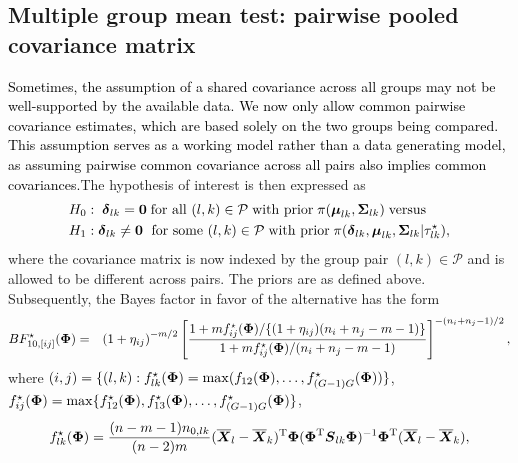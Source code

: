 \documentclass[pdflatex,sn-basic]{sn-jnl}%
\newcommand{\uzero}            {\mbox{\boldmath$0$}}
\def\be{\begin{eqnarray}}
\def\ee{\end{eqnarray}}
\def\trans{^{\rm T}}
\newcommand{\uS}       {\mbox{\boldmath$S$}}
\newcommand{\uX}       {\mbox{\boldmath$X$}}
\newcommand{\udelta}            {\mbox{\boldmath$\delta$}}
\newcommand{\umu}               {\mbox{\boldmath$\mu$}}
\newcommand{\uSigma}            {\mbox{\boldmath$\Sigma$}}
\newcommand{\uPhi}              {\mbox{\boldmath$\Phi$}}
\theoremstyle{thmstyleone}%
\theoremstyle{thmstyletwo}%
\theoremstyle{thmstylethree}%
\begin{document}
\subsection{Multiple group mean test: pairwise pooled covariance matrix} \label{sec:testid}
\textcolor{black}{Sometimes, the assumption of a shared covariance across all groups may not be well-supported by the available data. We now only allow common pairwise covariance estimates, which are based solely on the two groups being compared. This assumption serves as a working model rather than a data generating model, as assuming pairwise common covariance across all pairs also implies common covariances.}The hypothesis of interest is then expressed as
\be
\begin{split}
H_{0}&:\;\udelta_{lk} = \uzero \; \mbox{for all }(l, k)\in\mathcal{P}
\;\mbox{with prior}\; \pi(\umu_{lk},\uSigma_{lk})\; \mbox{versus} \; \\ H_{1} &:
\udelta_{lk} \neq \uzero \; \mbox{ for some }(l, k)\in\mathcal{P}
\; \mbox{with prior} \; \pi(\udelta_{lk},\umu_{lk},\uSigma_{lk} | \tau_{lk}^\star), 
\label{eq:test2.3}
\end{split}
\ee
where the covariance matrix is now indexed by the group pair $(l, k)\in\mathcal{P}$ and is allowed to be different across pairs. The priors are as defined above. Subsequently, the Bayes factor in favor of the alternative has the form
\be
BF^{\star}_{10,[ij]}(\uPhi) &=& \left(1 + \eta_{ij} \right)^{-m/2} \left[ \frac{1 + {m f^{\star}_{ij}(\uPhi)}/\{(1 + \eta_{ij})(n_{i}+n_{j}-m-1)\}}{ 1 + {m f^{\star}_{ij}(\uPhi)}/{(n_{i}+n_{j}-m-1)}  } \right]^{-(n_{i}+n_{j}-1)/2}, \label{eq:BFmaxija}
\ee
where $(i, j) = \{(l, k) : f_{lk}^\star(\uPhi) = \max(f_{12}(\uPhi), \ldots, f_{(G-1)G}^\star(\uPhi) )  \}$, $f^{\star}_{ij}(\uPhi) = \max\{f^{\star}_{12}(\uPhi), f^{\star}_{13}(\uPhi), \ldots, f^{\star}_{(G-1)G}(\uPhi)\}$,  
\[
f^{\star}_{lk}(\uPhi) = \frac{(n-m-1)n_{0,lk}}{(n-2)m}  (\overline{\uX}_l - \overline{\uX}_k)\trans\uPhi(\uPhi\trans\uS_{lk}\uPhi)^{-1}\uPhi\trans(\overline{\uX}_l - \overline{\uX}_k),
\]
\end{document}
